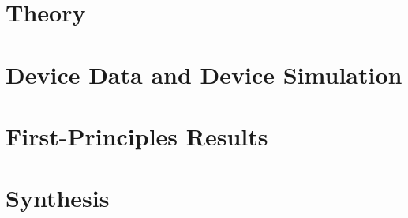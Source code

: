 \documentclass[11pt,oneside,openany]{report}
\begin{document}
\part{Theory}



\clearpage

\clearpage


\part{Device Data and Device Simulation}
\clearpage


\clearpage

\clearpage

\clearpage

\clearpage

\clearpage

\clearpage

\clearpage



\part{First-Principles Results}
\clearpage





\part{Synthesis}





\appendix
\clearpage

\clearpage

\clearpage

\clearpage

\clearpage





\cleardoublepage
{}
{}


\end{document}
